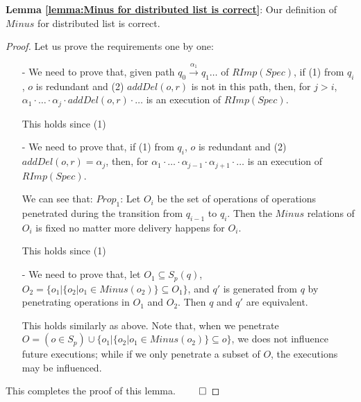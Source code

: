 {\noindent \bf Lemma \ref{lemma:Minus for distributed list is correct}}: Our definition of $Minus$ for distributed list is correct.
\begin {proof}
Let us prove the requirements one by one:


\begin{itemize}
\setlength{\itemsep}{0.5pt}
\item[-] We need to prove that, given path $q_0 {\xrightarrow{\alpha_1}} q_1 \ldots$ of $RImp(Spec)$, if (1) from $q_i$, $o$ is redundant and (2) $addDel(o,r)$ is not in this path, then, for $j>i$, $\alpha_1 \cdot \ldots \cdot \alpha_j \cdot addDel(o,r) \cdot \ldots$ is an execution of $RImp(Spec)$.

    This holds since (1)

\item[-] We need to prove that, if (1) from $q_i$, $o$ is redundant and (2) $addDel(o,r)=\alpha_j$, then, for $\alpha_1 \cdot \ldots \cdot \alpha_{j-1} \cdot \alpha_{j+1} \cdot \ldots$ is an execution of $RImp(Spec)$.

    We can see that: $Prop_1$: Let $O_i$ be the set of operations of operations penetrated during the transition from $q_{i-1}$ to $q_i$. Then the $Minus$ relations of $O_i$ is fixed no matter more delivery happens for $O_i$.

    This holds since (1)

\item[-] We need to prove that, let $O_1 \subseteq S_p(q)$, $O_2 = \{ o_1 \vert  \{ o_2 \vert o_1 \in Minus(o_2) \} \subseteq O_1 \}$, and $q'$ is generated from $q$ by penetrating operations in $O_1$ and $O_2$. Then $q$ and $q'$ are equivalent.

    This holds similarly as above. Note that, when we penetrate $O = (o \in S_p) \cup \{ o_1 \vert  \{ o_2 \vert o_1 \in Minus(o_2) \} \subseteq o \}$, we does not influence future executions; while if we only penetrate a subset of $O$, the executions may be influenced.
\end{itemize}

This completes the proof of this lemma. $\qed$
\end {proof}




